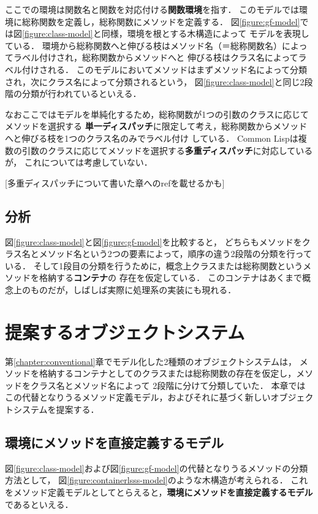 \documentclass[a4paper,11pt,dvipdfmx]{jreport}
\begin{document}
ここでの環境は関数名と関数を対応付ける\textbf{関数環境}を指す．
このモデルでは環境に総称関数を定義し，総称関数にメソッドを定義する．
図\ref{figure:gf-model}では図\ref{figure:class-model}と同様，環境を根とする木構造によって
モデルを表現している．
環境から総称関数へと伸びる枝はメソッド名（＝総称関数名）によってラベル付けされ，総称関数からメソッドへと
伸びる枝はクラス名によってラベル付けされる．
このモデルにおいてメソッドはまずメソッド名によって分類され，次にクラス名によって分類されるという，
図\ref{figure:class-model}と同じ2段階の分類が行われているといえる．

なおここではモデルを単純化するため，総称関数が1つの引数のクラスに応じてメソッドを選択する
\textbf{単一ディスパッチ}に限定して考え，総称関数からメソッドへと伸びる枝を1つのクラス名のみでラベル付け
している．
Common Lispは複数の引数のクラスに応じてメソッドを選択する\textbf{多重ディスパッチ}に対応しているが，
これについては考慮していない．

[多重ディスパッチについて書いた章へのrefを載せるかも]

\section{分析}

図\ref{figure:class-model}と図\ref{figure:gf-model}を比較すると，
どちらもメソッドをクラス名とメソッド名という2つの要素によって，順序の違う2段階の分類を行っている．
そして1段目の分類を行うために，概念上クラスまたは総称関数というメソッドを格納する\textbf{コンテナ}の
存在を仮定している．
このコンテナはあくまで概念上のものだが，しばしば実際に処理系の実装にも現れる．


\chapter{提案するオブジェクトシステム}

第\ref{chapter:conventional}章でモデル化した2種類のオブジェクトシステムは，
メソッドを格納するコンテナとしてのクラスまたは総称関数の存在を仮定し，メソッドをクラス名とメソッド名によって
2段階に分けて分類していた．
本章ではこの代替となりうるメソッド定義モデル，およびそれに基づく新しいオブジェクトシステムを提案する．

\section{環境にメソッドを直接定義するモデル}

図\ref{figure:class-model}および図\ref{figure:gf-model}の代替となりうるメソッドの分類方法として，
図\ref{figure:containerlsss-model}のような木構造が考えられる．
これをメソッド定義モデルとしてとらえると，\textbf{環境にメソッドを直接定義するモデル}であるといえる．
\end{document}
